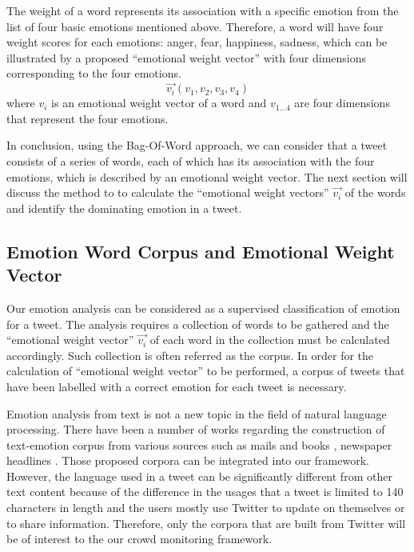 The weight of a word represents its association with a specific emotion from the list of four basic emotions mentioned above. Therefore, a word will have four weight scores for each emotions: anger, fear, happiness, sadness, which can be illustrated by a proposed ``emotional weight vector'' with four dimensions corresponding to the four emotions. 
\[
	\vec{v_i}(v_1, v_2, v_3, v_4)
\] where \(v_i\) is an emotional weight vector of a word and \(v_{1...4}\) are four dimensions that represent the four emotions.

In conclusion, using the Bag-Of-Word approach, we can consider that a tweet consists of a series of words, each of which has its association with the four emotions, which is described by an emotional weight vector. The next section will discuss the method to to calculate the ``emotional weight vectors'' \(\vec{v_i}\) of the words and identify the dominating emotion in a tweet.

\subsection{Emotion Word Corpus and Emotional Weight Vector}
Our emotion analysis can be considered as a supervised classification of emotion for a tweet. The analysis requires a collection of words to be gathered and the ``emotional weight vector'' \(\vec{v_i}\) of each word in the collection must be calculated accordingly. Such collection is often referred as the corpus. In order for the calculation of ``emotional weight vector'' to be performed, a corpus of tweets that have been labelled with a correct emotion for each tweet is necessary.

Emotion analysis from text is not a new topic in the field of natural language processing. There have been a number of works regarding the construction of text-emotion corpus from various sources such as mails \citep{mohammad2011tracking} and books \citep{mohammad2011once}, newspaper headlines \citep{strapparava2008learning}. Those proposed corpora can be integrated into our framework. However, the language used in a tweet can be significantly different from other text content because of the difference in the usages that a tweet is limited to 140 characters in length and the users mostly use Twitter to update on themselves or to share information. Therefore, only the corpora that are built from Twitter will be of interest to the our crowd monitoring framework.

